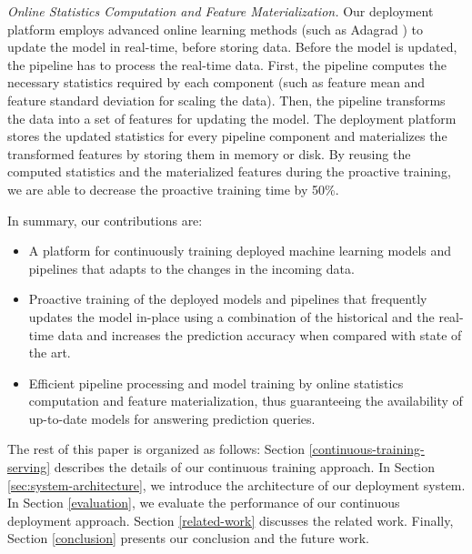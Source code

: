 \textit{Online Statistics Computation and Feature Materialization.}
Our deployment platform employs advanced online learning methods (such as Adagrad \cite{duchi2011adaptive}) to update the model in real-time, before storing data.
Before the model is updated, the pipeline has to process the real-time data.
First, the pipeline computes the necessary statistics required by each component (such as feature mean and feature standard deviation for scaling the data).
Then, the pipeline transforms the data into a set of features for updating the model. 
The deployment platform stores the updated statistics for every pipeline component and materializes the transformed features by storing them in memory or disk.
By reusing the computed statistics and the materialized features during the proactive training, we are able to decrease the proactive training time by 50\%.

In summary, our contributions are:
\begin{itemize}
\item A platform for continuously training deployed machine learning models and pipelines that adapts to the changes in the incoming data.
\item Proactive training of the deployed models and pipelines that frequently updates the model in-place using a combination of the historical and the real-time data and increases the prediction accuracy when compared with state of the art.
\item Efficient pipeline processing and model training by online statistics computation and feature materialization, thus guaranteeing the availability of up-to-date models for answering prediction queries.
\end{itemize}

The rest of this paper is organized as follows:
Section \ref{continuous-training-serving} describes the details of our continuous training approach.
In Section \ref{sec:system-architecture}, we introduce the architecture of our deployment system.
In Section \ref{evaluation}, we evaluate the performance of our continuous deployment approach.
Section \ref {related-work} discusses the related work.
Finally, Section \ref{conclusion} presents our conclusion and the future work.
